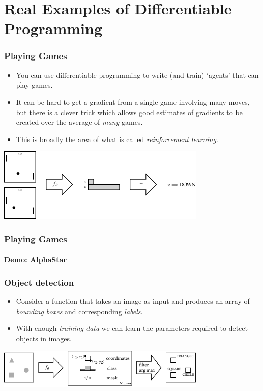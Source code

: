 \documentclass[]{article}
\begin{document}
\section{Real Examples of Differentiable Programming}

\begin{frame}
\frametitle{Playing Games}

\begin{itemize}
	\item You can use differentiable programming to write (and train) `agents' that can play games.
	\item It can be hard to get a gradient from a single game involving many moves, but there is a clever trick which allows good estimates of gradients to be created over the average of \emph{many} games.
	\item This is broadly the area of what is called \emph{reinforcement learning}.
\end{itemize}

\begin{center}
\includegraphics[width=0.75\textwidth]{pong}
\end{center}
\end{frame}

\begin{frame}
\frametitle{Playing Games}
\framesubtitle{Demo: AlphaStar}
\end{frame}

\begin{frame}
\frametitle{Object detection}

\begin{itemize}
	\item Consider a function that takes an image as input and produces an array of \emph{bounding boxes} and corresponding \emph{labels}.
	\item With enough \emph{training data} we can learn the parameters required to detect objects in images.
\end{itemize}

\begin{center}
\includegraphics[width=0.75\textwidth]{objdet-sets}
\end{center}
\end{frame}
\end{document}
